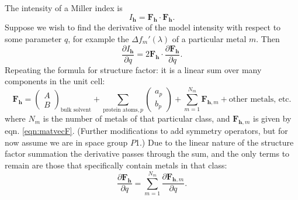 \documentclass[12pt, letterpaper]{article}
\begin{document}
The intensity of a Miller index is 
     \begin{equation}
    I_{\mathbf{h}} = \mathbf{F}_{\mathbf{h}} \cdot \mathbf{F}_{\mathbf{h}}
    \text{.}
    \label{eqn:iall}
  \end{equation}
Suppose we wish to find the derivative of the model intensity with respect to some parameter $q$, for example
the $\Delta{f_m}\prime(\lambda)$ of a particular metal $m$.  Then
     \begin{equation}
    \frac{\partial{I}_{\mathbf{h}}}{\partial{q}} = 2\mathbf{F}_{\mathbf{h}} \cdot 
    \frac{\partial\mathbf{F}_{\mathbf{h}}} {\partial{q}}
    \text{.}
    \label{eqn:ialld}
  \end{equation}
Repeating the formula for structure factor:  it is a linear sum over many components in the unit cell:
       \begin{equation}
    \mathbf{F_h} =\left( \begin{array}{c}
      A \\
      B
    \end{array}\right)_{\textrm{bulk solvent}} +
    \sum_{\textrm{protein atoms}, p}\left( \begin{array}{c}
      a_p \\
      b_p
    \end{array}\right)+ 
    \sum_{m=1}^{N_m} \mathbf{F}_{\mathbf{h},m}+\textrm{other metals, etc.}
    \text{}
    \label{eqn:partsrecap}
  \end{equation}
where $N_m$ is the number of metals of that particular class, and  $\mathbf{F}_{\mathbf{h},m}$ is given by eqn. 
\eqref{eqn:matvecF}.
(Further modifications to add symmetry operators,
but for now assume we are in space group $P$1.)
Due to the linear nature of the structure factor summation the derivative passes through the sum, and the 
only terms to remain are those that specifically contain metals in that class:
       \begin{equation}
  \frac{\partial\mathbf{F}_{\mathbf{h}}} {\partial{q}} =   \sum_{m=1}^{N_m} 
  \frac {\partial\mathbf{F}_{\mathbf{h},m}}{\partial{q}}
      \text{.}
    \label{eqn:derOnq}
  \end{equation}

\end{document}
